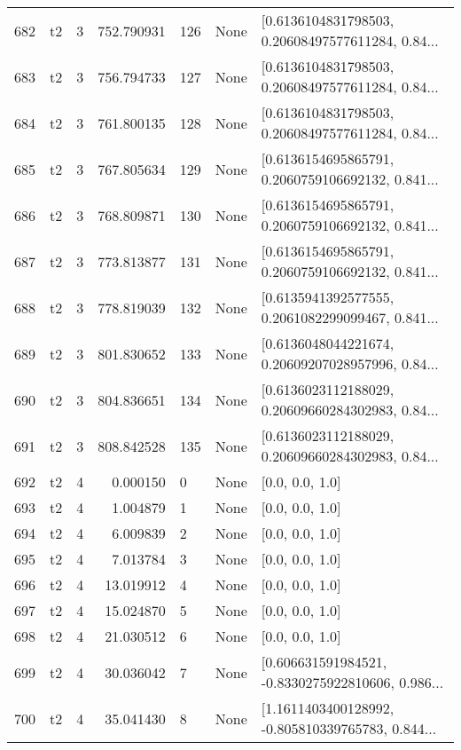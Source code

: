 \begin{tabular}{lllrlll}
682 &  t2 &   3 &   752.790931 &  126 &  None &  [0.6136104831798503, 0.20608497577611284, 0.84... \\
683 &  t2 &   3 &   756.794733 &  127 &  None &  [0.6136104831798503, 0.20608497577611284, 0.84... \\
684 &  t2 &   3 &   761.800135 &  128 &  None &  [0.6136104831798503, 0.20608497577611284, 0.84... \\
685 &  t2 &   3 &   767.805634 &  129 &  None &  [0.6136154695865791, 0.2060759106692132, 0.841... \\
686 &  t2 &   3 &   768.809871 &  130 &  None &  [0.6136154695865791, 0.2060759106692132, 0.841... \\
687 &  t2 &   3 &   773.813877 &  131 &  None &  [0.6136154695865791, 0.2060759106692132, 0.841... \\
688 &  t2 &   3 &   778.819039 &  132 &  None &  [0.6135941392577555, 0.2061082299099467, 0.841... \\
689 &  t2 &   3 &   801.830652 &  133 &  None &  [0.6136048044221674, 0.20609207028957996, 0.84... \\
690 &  t2 &   3 &   804.836651 &  134 &  None &  [0.6136023112188029, 0.20609660284302983, 0.84... \\
691 &  t2 &   3 &   808.842528 &  135 &  None &  [0.6136023112188029, 0.20609660284302983, 0.84... \\
692 &  t2 &   4 &     0.000150 &    0 &  None &                                    [0.0, 0.0, 1.0] \\
693 &  t2 &   4 &     1.004879 &    1 &  None &                                    [0.0, 0.0, 1.0] \\
694 &  t2 &   4 &     6.009839 &    2 &  None &                                    [0.0, 0.0, 1.0] \\
695 &  t2 &   4 &     7.013784 &    3 &  None &                                    [0.0, 0.0, 1.0] \\
696 &  t2 &   4 &    13.019912 &    4 &  None &                                    [0.0, 0.0, 1.0] \\
697 &  t2 &   4 &    15.024870 &    5 &  None &                                    [0.0, 0.0, 1.0] \\
698 &  t2 &   4 &    21.030512 &    6 &  None &                                    [0.0, 0.0, 1.0] \\
699 &  t2 &   4 &    30.036042 &    7 &  None &  [0.606631591984521, -0.8330275922810606, 0.986... \\
700 &  t2 &   4 &    35.041430 &    8 &  None &  [1.1611403400128992, -0.805810339765783, 0.844... \\

\end{tabular}
